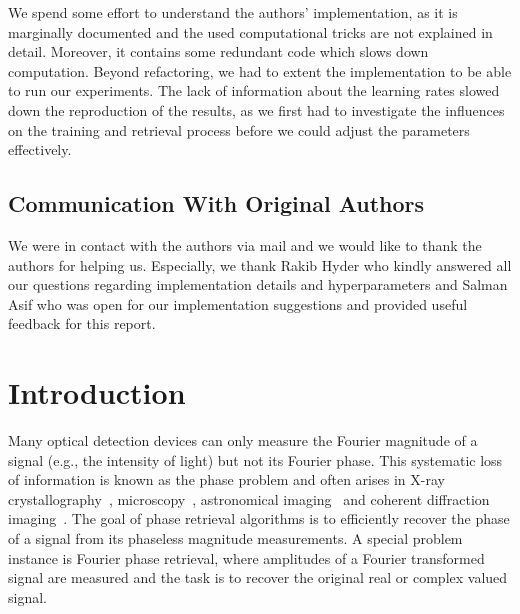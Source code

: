 We spend some effort to understand the authors' implementation, as it is marginally documented and the used computational tricks are not explained in detail. Moreover, it contains some redundant code which slows down computation. Beyond refactoring, we had to extent the implementation to be able to run our experiments. The lack of information about the learning rates slowed down the reproduction of the results, as we first had to investigate the influences on the training and retrieval process before we could adjust the parameters effectively.

\subsection*{Communication With Original Authors}


We were in contact with the authors via mail and we would like to
thank the authors for helping us.  Especially, we thank Rakib Hyder
who kindly answered all our questions regarding implementation details
and hyperparameters and Salman Asif who was open for our
implementation suggestions and provided useful feedback for this
report.




\newpage
\section{Introduction}

Many optical detection devices can only measure the Fourier magnitude of a signal (e.g., the intensity of light) but not its Fourier phase. This systematic loss of information is known as the phase problem and often arises in X-ray crystallography~\cite{Millane:90}, microscopy~\cite{mico}, astronomical imaging~\cite{Fienup:19} and coherent diffraction imaging~\cite{doi:10.1137/151005099}. The goal of phase retrieval algorithms is to efficiently recover the phase of a signal from its phaseless magnitude measurements. A special problem instance is Fourier phase retrieval, where amplitudes of a Fourier transformed signal are measured and the task is to recover the original real or complex valued signal.

